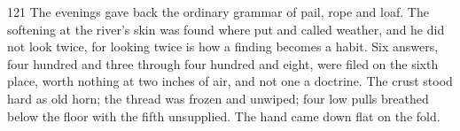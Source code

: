 \begin{CRchronicle}{121}
The evenings gave back the ordinary grammar of pail, rope and loaf. The softening at the river’s skin was found where put and called weather, and he did not look twice, for looking twice is how a finding becomes a habit. Six answers, four hundred and three through four hundred and eight, were filed on the sixth place, worth nothing at two inches of air, and not one a doctrine. The crust stood hard as old horn; the thread was frozen and unwiped; four low pulls breathed below the floor with the fifth unsupplied. The hand came down flat on the fold.
\end{CRchronicle}

